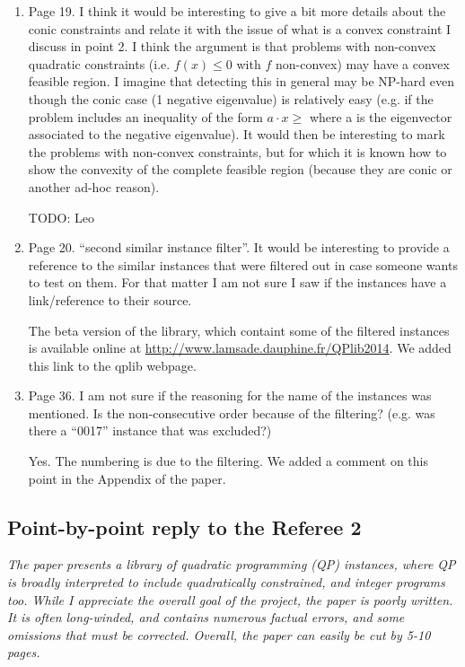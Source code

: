 \documentclass[11pt]{article}
\newcommand{\rep}[1]{{\textcolor{acblue}{#1}}}
\newcommand{\leo}[1]{{\color{red}#1}}
\newcommand{\fabio}[1]{{\color{cyan}#1}}
\begin{document}
{\begin{enumerate}
\item Page 19. I think it would be interesting to give a bit more details about the conic constraints and relate it with the issue of what is a convex
constraint I discuss in point 2. I think the argument is that problems with
non-convex quadratic constraints (i.e. $f (x) \le 0$ with $f$ non-convex) may
have a convex feasible region. I imagine that detecting this in general may
be NP-hard even though the conic case (1 negative eigenvalue) is relatively
easy (e.g. if the problem includes an inequality of the form $a \cdot x \ge$ where
a is the eigenvector associated to the negative eigenvalue). It would then
be interesting to mark the problems with non-convex constraints, but for
which it is known how to show the convexity of the complete feasible
region (because they are conic or another ad-hoc reason).

\rep{TODO: Leo
 }


\item Page 20. ``second similar instance filter''. It would be interesting to provide a reference to the similar instances that were filtered out in case
someone wants to test on them. For that matter I am not sure I saw if
the instances have a link/reference to their source.


\rep{The beta version of the library, which containt some of the filtered instances is available online at  \url{http://www.lamsade.dauphine.fr/QPlib2014}. We added this link to the qplib webpage.}



\item Page 36. I am not sure if the reasoning for the name of the instances was mentioned. Is the non-consecutive order because of the filtering? (e.g.
was there a ``0017'' instance that was excluded?)

\rep{Yes. The numbering is due to the filtering. We added a comment on this point in the Appendix of the paper.}


\end{enumerate}
}



\subsection*{Point-by-point reply to the Referee 2}


{\it
The paper presents a library of quadratic programming (QP) instances, where QP is broadly interpreted
to include quadratically constrained, and integer programs too. While I appreciate the overall goal of
the project, the paper is poorly written. It is often long-winded, and contains numerous factual errors,
and some omissions that must be corrected. Overall, the paper can easily be cut by 5-10 pages.
}
\end{document}
